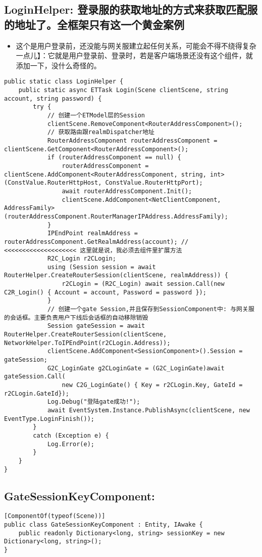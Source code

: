 \documentclass[9pt, b5paper]{article}
\begin{document}
\subsection{LoginHelper: 登录服的获取地址的方式来获取匹配服的地址了。全框架只有这一个黄金案例}
\label{sec-8-17}
\begin{itemize}
\item 这个是用户登录前，还没能与网关服建立起任何关系，可能会不得不绕得复杂一点儿】：它就是用户登录前、登录时，若是客户端场景还没有这个组件，就添加一下，没什么奇怪的。
\end{itemize}
\begin{verbatim}
public static class LoginHelper {
    public static async ETTask Login(Scene clientScene, string account, string password) {
        try {
            // 创建一个ETModel层的Session
            clientScene.RemoveComponent<RouterAddressComponent>();
            // 获取路由跟realmDispatcher地址
            RouterAddressComponent routerAddressComponent = clientScene.GetComponent<RouterAddressComponent>();
            if (routerAddressComponent == null) {
                routerAddressComponent = clientScene.AddComponent<RouterAddressComponent, string, int>(ConstValue.RouterHttpHost, ConstValue.RouterHttpPort);
                await routerAddressComponent.Init();
                clientScene.AddComponent<NetClientComponent, AddressFamily>(routerAddressComponent.RouterManagerIPAddress.AddressFamily);
            }
            IPEndPoint realmAddress = routerAddressComponent.GetRealmAddress(account); // <<<<<<<<<<<<<<<<<<<< 这里就是说，我必须去组件里扩展方法
            R2C_Login r2CLogin;
            using (Session session = await RouterHelper.CreateRouterSession(clientScene, realmAddress)) {
                r2CLogin = (R2C_Login) await session.Call(new C2R_Login() { Account = account, Password = password });
            }
            // 创建一个gate Session,并且保存到SessionComponent中: 与网关服的会话框。主要负责用户下线后会话框的自动移除销毁
            Session gateSession = await RouterHelper.CreateRouterSession(clientScene, NetworkHelper.ToIPEndPoint(r2CLogin.Address));
            clientScene.AddComponent<SessionComponent>().Session = gateSession;
            G2C_LoginGate g2CLoginGate = (G2C_LoginGate)await gateSession.Call(
                new C2G_LoginGate() { Key = r2CLogin.Key, GateId = r2CLogin.GateId});
            Log.Debug("登陆gate成功!");
            await EventSystem.Instance.PublishAsync(clientScene, new EventType.LoginFinish());
        }
        catch (Exception e) {
            Log.Error(e);
        }
    } 
}
\end{verbatim}
\subsection{GateSessionKeyComponent:}
\label{sec-8-18}
\begin{verbatim}
[ComponentOf(typeof(Scene))]
public class GateSessionKeyComponent : Entity, IAwake {
    public readonly Dictionary<long, string> sessionKey = new Dictionary<long, string>();
}
\end{verbatim}
\end{document}
